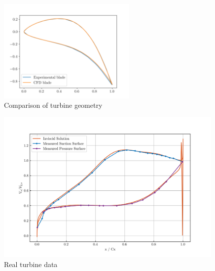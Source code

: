 \documentclass{article}
\begin{document}
\begin{figure}[H]
    \centering
    \includegraphics[width=0.6\textwidth]{figures/turbine_geometry.png}
    \caption{Comparison of turbine geometry}
    \label{fig:turbine_geometry}
\end{figure}

\begin{figure}[H]
    \centering
    \includegraphics[width=0.99\textwidth]{figures/turbine_real.png}
    \caption{Real turbine data \cite{4A3_lab}}
    \label{fig:turbine_real}
\end{figure}
\end{document}
